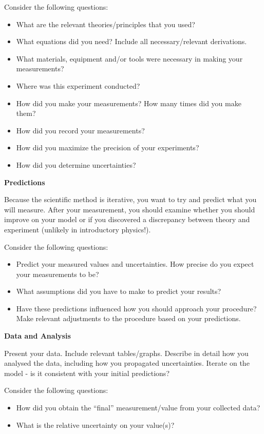 Consider the following questions:
\begin{itemize}
\item What are the relevant theories/principles that you used? 
\item What equations did you need? Include all necessary/relevant derivations.
\item What materials, equipment and/or tools were necessary in making your measurements?
\item Where was this experiment conducted?
\item How did you make your measurements? How many times did you make them?
\item How did you record your measurements?
\item How did you maximize the precision of your experiments?
\item How did you determine uncertainties?
\end{itemize}

\textbf{Predictions}

Because the scientific method is iterative, you want to try and predict what you will measure. After your measurement, you should examine whether you should improve on your model or if you discovered a discrepancy between theory and experiment (unlikely in introductory physics!).

Consider the following questions:
\begin{itemize}
\item Predict your measured values and uncertainties. How precise do you expect your measurements to be?
\item What assumptions did you have to make to predict your results?
\item Have these predictions influenced how you should approach your procedure? Make relevant adjustments to the procedure based on your predictions.
\end{itemize}

\textbf{Data and Analysis}

Present your data. Include relevant tables/graphs. Describe in detail how you analysed the data, including how you propagated uncertainties. Iterate on the model - is it consistent with your initial predictions?

Consider the following questions:
\begin{itemize}
\item How did you obtain the ``final'' measurement/value from your collected data?
\item What is the relative uncertainty on your value(s)?
\end{itemize}

